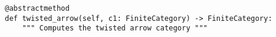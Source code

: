 \par\begin{minipage}{62ex}
\begin{verbatim}
@abstractmethod
def twisted_arrow(self, c1: FiniteCategory) -> FiniteCategory:
    """ Computes the twisted arrow category """
\end{verbatim}
\end{minipage}\par